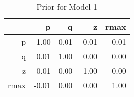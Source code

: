 \begin{table}[ht]
\centering
\begin{tabular}{rrrrr}
  \hline
 & p & q & z & rmax \\ 
  \hline
p & 1.00 & 0.01 & -0.01 & -0.01 \\ 
  q & 0.01 & 1.00 & 0.00 & 0.00 \\ 
  z & -0.01 & 0.00 & 1.00 & 0.00 \\ 
  rmax & -0.01 & 0.00 & 0.00 & 1.00 \\ 
   \hline
\end{tabular}
\caption{Prior for Model 1} 
\label{tab:param_correlations_prior_model_1}
\end{table}

